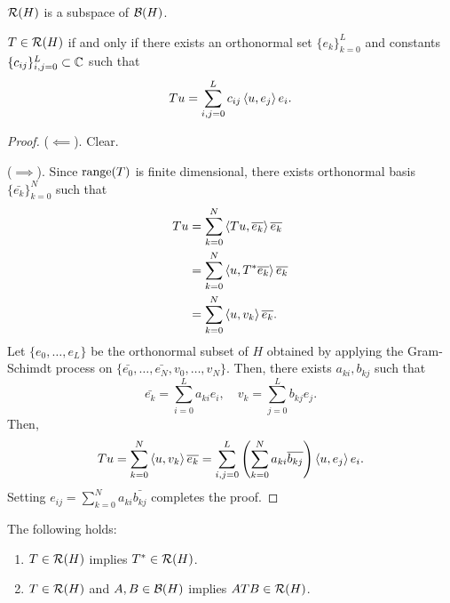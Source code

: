 \documentclass[a4paper]{article}
\begin{document}
\begin{thm}
$\mathcal{R} (H)$ is a subspace of $\mathcal{B} (H)$.
\end{thm}

\begin{thm}
$T \in \mathcal{R} (H)$ if and only if there exists an 
orthonormal set $\{e_k\}_{k=0}^L$ and constants
$\{c_{ij}\}_{i,j=0}^L \subset \mathbb{C}$ such that 
\[
T u = \sum_{i, j = 0}^L c_{ij} \left\langle u, e_j \right\rangle e_i.
\]
\end{thm}

\begin{proof}
($\impliedby$). Clear. 

($\implies$). Since $\operatorname{range}(T)$ is finite dimensional, there 
exists orthonormal basis $\{\bar{e_k}\}_{k=0}^N$ such that 
\[
\begin{aligned}
  T u 
  &= \sum_{k=0}^N \left\langle T u, \overline{e_k} \right\rangle \overline{e_k} \\
  &= \sum_{k=0}^N \left\langle u, T^* \overline{e_k} \right\rangle \overline{e_k} \\
  &= \sum_{k=0}^N \left\langle u, v_k \right\rangle \overline{e_k}.
\end{aligned}
\]
Let $\{e_0, \dots, e_L\}$ be the orthonormal subset 
of $H$ obtained by applying the Gram-Schimdt process 
on $\{\bar{e_0}, \dots, \bar{e_N}, v_0, \dots, v_N\}$. 
Then, there exists $a_{ki}, b_{kj}$ such that 
\[
\bar{e_k} = \sum_{i=0}^L a_{ki} e_i, \quad 
v_k = \sum_{j=0}^L b_{kj} e_j.
\]
Then, 
\[
T u = \sum_{k=0}^N \left\langle u, v_k \right\rangle \overline{e_k}
= \sum_{i, j = 0}^L \left( \sum_{k=0}^N a_{ki} 
\overline{b_{kj}} \right) \left\langle u, e_j \right\rangle e_i.
\]
Setting $e_{ij} = \sum_{k=0}^N a_{ki} \bar{b_{kj}}$
completes the proof.
\end{proof}

\begin{thm}
The following holds:
\begin{enumerate}
  \item $T \in \mathcal{R}(H)$ implies $T^* \in \mathcal{R} (H)$. 
  \item $T \in \mathcal{R}(H)$ and $A, B \in \mathcal{B}(H)$ implies 
  $A T B \in \mathcal{R}(H)$.
\end{enumerate}
\end{thm}
\end{document}
